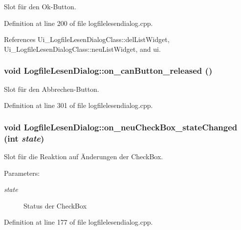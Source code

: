 Slot für den Ok-Button. 



Definition at line 200 of file logfilelesendialog.cpp.

References Ui\_\-LogfileLesenDialogClass::delListWidget, Ui\_\-LogfileLesenDialogClass::neuListWidget, and ui.\hypertarget{class_logfile_lesen_dialog_bb7a15f0816b93d9ef3c8f044952d3f9}{
\subsubsection[on\_\-canButton\_\-released]{\setlength{\rightskip}{0pt plus 5cm}void LogfileLesenDialog::on\_\-canButton\_\-released ()}}
\label{class_logfile_lesen_dialog_bb7a15f0816b93d9ef3c8f044952d3f9}


Slot für den Abbrechen-Button. 



Definition at line 301 of file logfilelesendialog.cpp.\hypertarget{class_logfile_lesen_dialog_04e5cfc7ccc5a9e9f3b085de0f1f2bce}{
\subsubsection[on\_\-neuCheckBox\_\-stateChanged]{\setlength{\rightskip}{0pt plus 5cm}void LogfileLesenDialog::on\_\-neuCheckBox\_\-stateChanged (int {\em state})}}
\label{class_logfile_lesen_dialog_04e5cfc7ccc5a9e9f3b085de0f1f2bce}


Slot für die Reaktion auf Änderungen der CheckBox. 

\begin{Desc}
\item[Parameters:]
\begin{description}
\item[{\em state}]Status der CheckBox \end{description}
\end{Desc}


Definition at line 177 of file logfilelesendialog.cpp.

